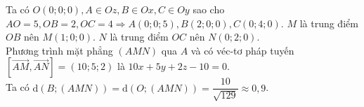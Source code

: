 \begin{ex}
{\begin{center}
		\end{center}
		Ta có $O(0 ; 0 ; 0), A \in {Oz}, B \in O x, C \in O y$ sao cho $A O=5, OB=2, OC=4\Rightarrow A(0 ; 0 ; 5), B(2 ; 0 ; 0), C(0 ; 4 ; 0)$. $M$ là trung điểm $OB$ nên $M(1 ; 0 ; 0)$. $N$ là trung điểm $OC$ nên $N(0 ; 2 ; 0)$.\\
		Phương trình mặt phẳng $(AMN)$ qua $A$ và có véc-tơ pháp tuyến $[\overrightarrow{AM},\overrightarrow{AN}]=(10;5;2)$ là $10x + 5y + 2z - 10 = 0$.\\
		Ta có $\mathrm{d}(B;(AMN))=\mathrm{d}(O;(AMN))=\dfrac{10}{\sqrt{129}}\approx 0{,}9$.
		
	}
\end{ex}

